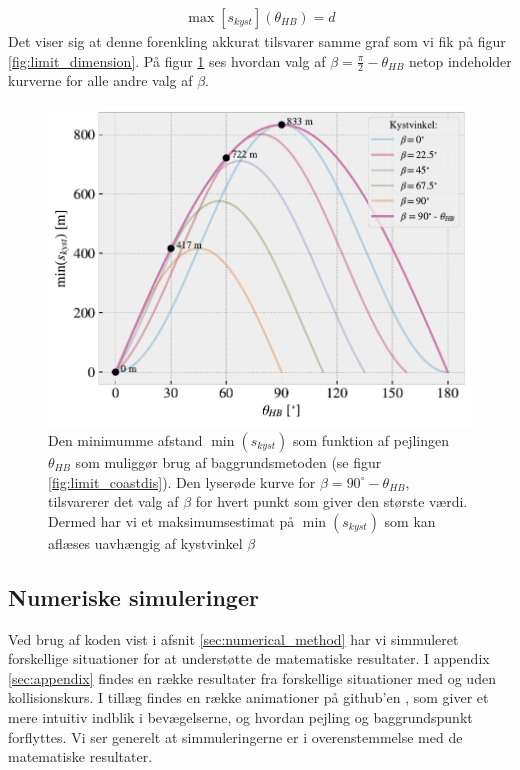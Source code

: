\documentclass[%
 reprint,
nofootinbib,
aps,
]{revtex4-1}
\begin{document}
\begin{align}
  \max{[s_{kyst}]}(\theta_{HB}) = d
  \label{eq:max_s_kyst}
\end{align}
Det viser sig at denne forenkling akkurat tilsvarer samme graf som vi fik på figur \ref{fig:limit_dimension}. På figur \ref{fig:limit_coastdis_betamax} ses hvordan valg af $\beta = \frac{\pi}{2} - \theta_{HB}$ netop indeholder kurverne for alle andre valg af $\beta$.
\begin{figure}[H]
  \includegraphics[width=\linewidth]{figures/limit_coastdis_betamax.pdf}
  \caption{Den minimumme afstand $\min{(s_{kyst})}$ som funktion af pejlingen $\theta_{HB}$ som muliggør brug af baggrundsmetoden (se figur \ref{fig:limit_coastdis}). Den lyserøde kurve for $\beta = 90^{\circ} - \theta_{HB}$, tilsvarerer det valg af $\beta$ for hvert punkt som giver den største værdi. Dermed har vi et maksimumsestimat på $\min{(s_{kyst})}$ som kan aflæses uavhængig af kystvinkel $\beta$ }
  \label{fig:limit_coastdis_betamax}
\end{figure}

\subsection{Numeriske simuleringer}
Ved brug af koden vist i afsnit \ref{sec:numerical_method} har vi simmuleret forskellige situationer for at understøtte de matematiske resultater. I appendix \ref{sec:appendix} findes en række resultater fra forskellige situationer med og uden kollisionskurs. I tillæg findes en række animationer på github'en \cite{github}, som giver et mere intuitiv indblik i bevægelserne, og hvordan pejling og baggrundspunkt forflyttes. Vi ser generelt at simmuleringerne er i overenstemmelse med de matematiske resultater.
\end{document}
